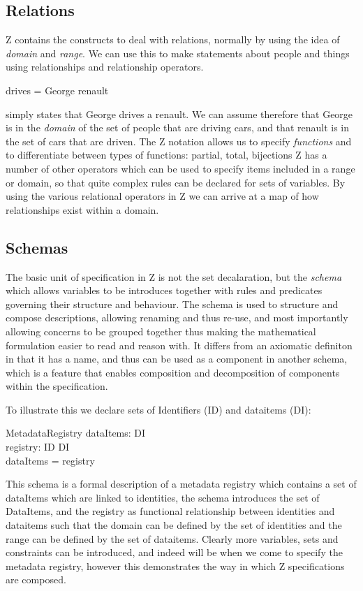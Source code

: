 \documentclass{llncs}
\begin{document}
\subsection{Relations}
Z contains the constructs to deal with relations, normally by using the idea of \emph{domain} and \emph{range}. We can use this to make statements about people and things using relationships and relationship operators. 
\begin{zed}
drives = {George \mapsto renault}
\end{zed} simply states that George drives a renault. We can assume therefore that George is in the \emph{domain} of the set of people that are driving cars, and that renault is in the set of cars that are driven. The Z notation allows us to specify \emph{functions} and to differentiate between types of functions: partial, total, bijections Z has a number of other operators which can be used to specify items included in a range or domain, so that quite complex rules can be declared for sets of variables. By using the various relational operators in Z we can arrive at a map of how relationships exist within a domain.

\subsection{Schemas}

The basic unit of specification in Z is not the set decalaration, but the \emph{schema} which allows variables to be introduces together with rules and predicates governing their structure and behaviour. The schema is used to structure and compose descriptions, allowing renaming and thus re-use, and most importantly allowing concerns to be grouped together thus making the mathematical formulation easier to read and reason with. It differs from an axiomatic definiton in that it has a name, and thus can be used as a component in another schema, which is a feature that enables composition and decomposition of components within the specification.  

To illustrate this we declare sets of Identifiers (ID) and dataitems (DI):
\begin{zed}
 [ID, DI]
 \end{zed}
\begin{schema}{MetadataRegistry}
 dataItems: \power DI\\
 registry: ID \fun DI\\
 \where
 dataItems = \ran registry
\end{schema}
This schema is a formal description of a metadata registry which contains a set of dataItems which are linked to identities, the schema introduces the set of DataItems, and the registry as functional relationship between identities and dataitems such that the domain can be defined by the set of identities and the range can be defined by the set of dataitems. Clearly more variables, sets and constraints can be introduced, and indeed will be when we come to specify the metadata registry, however this demonstrates the way in which Z specifications are composed.
\end{document}

